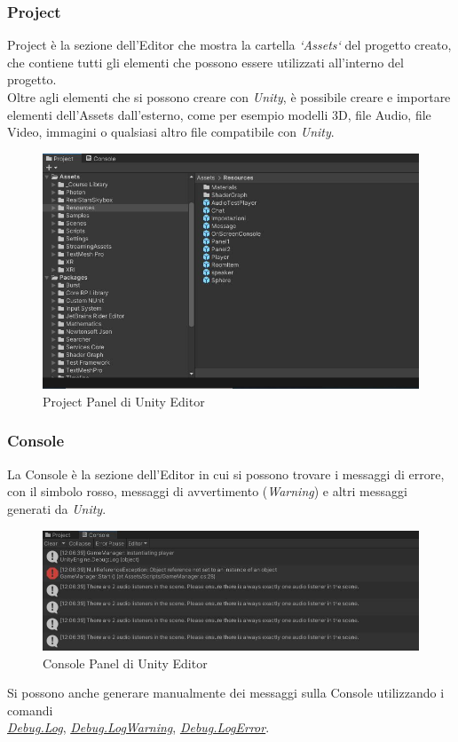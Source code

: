 \subsubsection{Project}
Project\cite{unityProject} è la sezione dell'Editor che mostra la cartella \textit{`Assets`} del progetto creato, che contiene tutti gli elementi che possono essere utilizzati all'interno del progetto.
\\Oltre agli elementi che si possono creare con \textit{Unity}, è possibile creare e importare elementi dell'Assets dall'esterno, come per esempio modelli 3D, file Audio, file Video, immagini o qualsiasi altro file compatibile con \textit{Unity}.
\vspace{1cm}
\begin{figure}[H]
    \centering
    \includegraphics[scale = 0.7]{Immagini/Project.jpg}
    \caption{Project Panel di Unity Editor}
    \label{fig:my_label}
\end{figure}
\subsubsection{Console}
La Console\cite{unityconsole} è la sezione dell'Editor in cui si possono trovare i messaggi di errore, con il simbolo rosso, messaggi di avvertimento (\textit{Warning}) e altri messaggi generati da \textit{Unity}.
\begin{figure}[H]
    \centering
    \includegraphics[scale = 0.75]{Immagini/Console.jpg}
    \caption{Console Panel di Unity Editor}
    \label{fig:my_label}
\end{figure}
\hspace{-0.6cm}Si possono anche generare manualmente dei messaggi sulla Console utilizzando i comandi \\\textit{\underline{Debug.Log}}, \textit{\underline{Debug.LogWarning}}, \textit{\underline{Debug.LogError}}.
